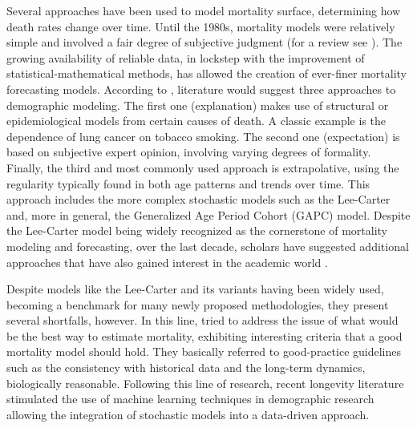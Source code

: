 \documentclass[fleqn,10pt]{wlscirep}
\begin{document}
Several approaches have been used to model mortality surface, determining how death rates change over time. Until the 1980s, mortality models were relatively simple and involved a fair degree of subjective judgment (for a review see \cite{Pollard}). The growing availability of reliable data, in lockstep with the improvement of statistical-mathematical methods, has allowed the creation of ever-finer mortality forecasting models. According to \cite{Booth}, literature would suggest three approaches to demographic modeling. The first one (explanation) makes use of structural or epidemiological models from certain causes of death. A classic example is the dependence of lung cancer on tobacco smoking. The second one (expectation) is based on subjective expert opinion, involving varying degrees of formality. Finally, the third and most commonly used approach is extrapolative, using the regularity typically found in both age patterns and trends over time.
This approach includes the more complex stochastic models such as the Lee-Carter \cite{LC92} and, more in general, the Generalized Age Period Cohort (GAPC) model. Despite the Lee-Carter model being widely recognized as the cornerstone of mortality modeling and forecasting, over the last decade, scholars have suggested additional approaches that have also gained interest in the academic world \cite{BDV2002,RH,CBD06,CBD09}.

Despite models like the Lee-Carter and its variants having been widely used, becoming a benchmark for many newly proposed methodologies, they present several shortfalls, however. 
In this line, \cite{CBD08} tried to address the issue of what would be the best way to estimate mortality, exhibiting interesting criteria that a good mortality model should hold. They basically referred to good-practice guidelines such as the consistency with historical data and the long-term dynamics, biologically reasonable. Following this line of research, recent longevity literature stimulated the use of machine learning techniques in demographic research allowing the integration of stochastic models into a data-driven approach. 
\end{document}
